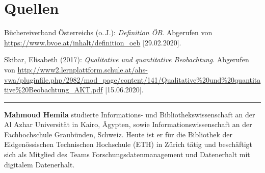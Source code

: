 \documentclass[a4paper,
fontsize=11pt,
oneside,
numbers=noperiodatend,
parskip=half-,
bibliography=totoc,
final
]{scrartcl}
\begin{document}
\hypertarget{quellen}{%
\section{Quellen}\label{quellen}}

Büchereiverband Österreichs (o.\,J.): \emph{Definition ÖB}. Abgerufen
von \url{https://www.bvoe.at/inhalt/definition_oeb} {[}29.02.2020{]}.

Skibar, Elisabeth (2017): \emph{Qualitative und quantitative
Beobachtung}. Abgerufen von
\url{http://www2.lernplattform.schule.at/ahs-vwa/pluginfile.php/2982/mod_page/content/141/Qualitative\%20und\%20quantitative\%20Beobachtung_AKT.pdf}
{[}15.06.2020{]}.

\begin{center}\rule{0.5\linewidth}{0.5pt}\end{center}

\textbf{Mahmoud Hemila} studierte Informations- und
Bibliothekswissenschaft an der Al Azhar Universität in Kairo, Ägypten,
sowie Informationswissenschaft an der Fachhochschule Graubünden,
Schweiz. Heute ist er für die Bibliothek der Eidgenössischen Technischen
Hochschule (ETH) in Zürich tätig und beschäftigt sich als Mitglied des
Teams Forschungsdatenmanagement und Datenerhalt mit digitalem
Datenerhalt.
\end{document}
